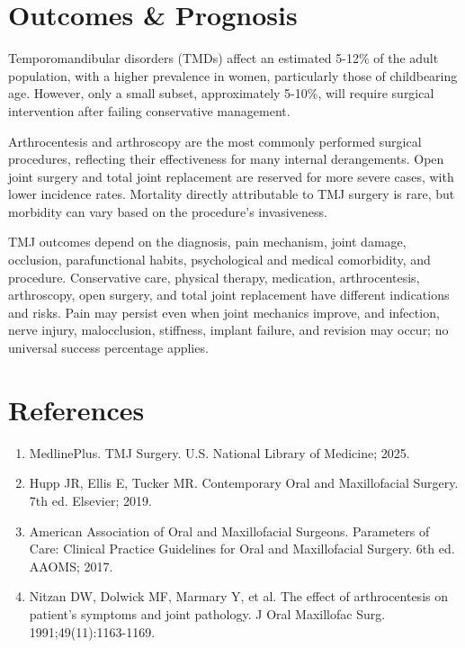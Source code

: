\section*{Outcomes \& Prognosis}
Temporomandibular disorders (TMDs) affect an estimated 5-12\% of the adult population, with a higher prevalence in women, particularly those of childbearing age. However, only a small subset, approximately 5-10\%, will require surgical intervention after failing conservative management. 

Arthrocentesis and arthroscopy are the most commonly performed surgical procedures, reflecting their effectiveness for many internal derangements. Open joint surgery and total joint replacement are reserved for more severe cases, with lower incidence rates. Mortality directly attributable to TMJ surgery is rare, but morbidity can vary based on the procedure's invasiveness.

TMJ outcomes depend on the diagnosis, pain mechanism, joint damage, occlusion, parafunctional habits, psychological and medical comorbidity, and procedure. Conservative care, physical therapy, medication, arthrocentesis, arthroscopy, open surgery, and total joint replacement have different indications and risks. Pain may persist even when joint mechanics improve, and infection, nerve injury, malocclusion, stiffness, implant failure, and revision may occur; no universal success percentage applies.

\section*{References}
\begin{enumerate}
  \item MedlinePlus. TMJ Surgery. U.S. National Library of Medicine; 2025.
  \item Hupp JR, Ellis E, Tucker MR. Contemporary Oral and Maxillofacial Surgery. 7th ed. Elsevier; 2019.
  \item American Association of Oral and Maxillofacial Surgeons. Parameters of Care: Clinical Practice Guidelines for Oral and Maxillofacial Surgery. 6th ed. AAOMS; 2017.
  \item Nitzan DW, Dolwick MF, Marmary Y, et al. The effect of arthrocentesis on patient's symptoms and joint pathology. J Oral Maxillofac Surg. 1991;49(11):1163-1169.
\end{enumerate}

\clearpage

